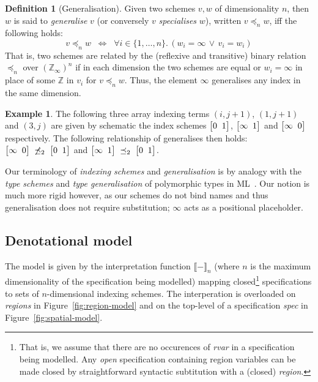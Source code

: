 \documentclass[9pt]{sigplanconf}
\newcounter{block}
\theoremstyle{definition}
\newtheorem{example}[block]{Example}
\newtheorem{definition}[block]{Definition}
\newcommand{\interp}[1]{\llbracket{#1}\rrbracket}
\newcommand{\vtwoh}[2]{\setlength{\arraycolsep}{0em}
\left[\begin{array}{cc}#1 \; & \; #2\end{array}\right]}
\begin{document}
\begin{definition}[Generalisation]
Given two schemes $v, w$ of dimensionality $n$,
then $w$ is said to \emph{generalise} $v$
(or conversely $v$ \emph{specialises} $w$),
written $v \preceq_n w$, iff the following holds:
\[
v \preceq_n w \;\; \Leftrightarrow  \;\;
  \forall i\!\in\!\{ 1, \ldots, n \} . \, (w_i = \infty \, \vee \, v_i = w_i)
\]
That is, two schemes are related by the (reflexive and transitive) binary relation
$\preceq_n$ over $(\mathbb{Z}_{\infty})^n$ if in each dimension
the two schemes are equal or $w_i = \infty$
in place of some $\mathbb{Z}$ in $v_i$ for $v \preceq_n w$.
Thus, the element $\infty$ generalises any index in the same dimension.
%
\end{definition}



\begin{example}
The following three array indexing terms
$(i, j+1)$, $(1, j+1)$ and $(3, j)$ 
are given by \textsf{schematic} the 
index schemes $\vtwoh{0}{1}$, $\vtwoh{\infty}{1}$
and $\vtwoh{\infty}{0}$ respectively. The following
relationship of generalises then holds:
$\vtwoh{\infty}{0} \; \not\preceq_2 \; \vtwoh{0}{1}$
and
$\vtwoh{\infty}{1} \; \preceq_2 \; \vtwoh{0}{1}$. 
\end{example}
\noindent
Our terminology of \emph{indexing schemes} and
\emph{generalisation} is by analogy
with the \emph{type schemes} and \emph{type generalisation} of
polymorphic types in ML~\cite{milner1978theory}. Our notion is
much more rigid however, as our schemes do not bind names
and thus generalisation does not require substitution; $\infty$ acts
as a positional placeholder.

\subsection{Denotational model}
\label{subsec:model}

The model is given by the interpretation function $\interp{-}_n$
(where $n$ is the maximum dimensionality of the specification being
modelled) mapping closed\footnote{That is, we assume that there are no
  occurences of \textit{rvar} in a specification being modelled.  Any
  \emph{open} specification containing region variables can be made
  closed by straightforward syntactic subtitution with a (closed)
  \textit{region}.} specifications to sets of
$n$-dimensional indexing schemes. The interperation is overloaded on
\emph{regions} in Figure~\ref{fig:region-model} and on the top-level
of a specification \textit{spec} in Figure~\ref{fig:spatial-model}.
\end{document}
